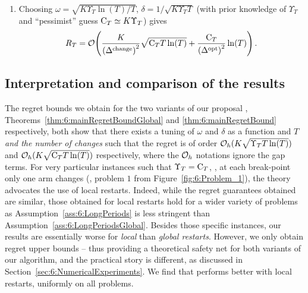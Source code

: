 \begin{corollary}
\begin{enumerate}
        \item Choosing $\omega = \sqrt{K\Upsilon_T\ln(T) / T}$, $\delta = 1 / \sqrt{K\Upsilon_T T}$ (with prior knowledge of $\Upsilon_T$ and ``pessimist'' guess $\mathrm{C}_T \simeq K \Upsilon_T$) gives
        \begin{equation}
            R_T = \mathop{}\mathopen{}\mathcal{O}\mathopen{}\left(\frac{K}{\left({\Delta}^{\text{change}}\right)^2}\sqrt{\mathrm{C}_T T\ln(T)} + \frac{\mathrm{C}_T}{\left(\Delta^{\text{opt}}\right)^2} \ln(T)\right).
        \end{equation}
    \end{enumerate}
\end{corollary}


\subsection{Interpretation and comparison of the results}
\label{sub:6:interpretationRegretBounds}

The regret bounds we obtain for the two variants of our proposal \GLRklUCB{},
Theorems~\ref{thm:6:mainRegretBoundGlobal} and \ref{thm:6:mainRegretBound} respectively,
both show that there exists a tuning of $\omega$ and $\delta$ as a function and $T$ \emph{and the number of changes} such that the regret is of order $\mathcal{O}_h(K\sqrt{\Upsilon_T T \ln(T)})$ and $\mathcal{O}_h(K\sqrt{\mathrm{C}_T T \ln(T)})$ respectively, where the $\mathcal{O}_h$ notations ignore the gap terms.
%
For very particular instances such that $\Upsilon_T = \mathrm{C}_T$, \ie, at each break-point only one arm changes (\eg, problem $1$ from Figure~\ref{fig:6:Problem_1}), the theory advocates the use of local restarts.
%
Indeed, while the regret guarantees obtained are similar, those obtained for local restarts hold for a wider variety of problems as Assumption~\ref{ass:6:LongPeriods} is less stringent than Assumption~\ref{ass:6:LongPeriodsGlobal}.
%
Besides those specific instances, our results are essentially worse for \emph{local} than \emph{global restarts}. However, we only obtain regret upper bounds -- thus providing a theoretical safety net for both variants of our algorithm, and the practical story is different, as discussed in Section~\ref{sec:6:NumericalExperiments}.
We find that \GLRklUCB{} performs better with local restarts, uniformly on all problems.

